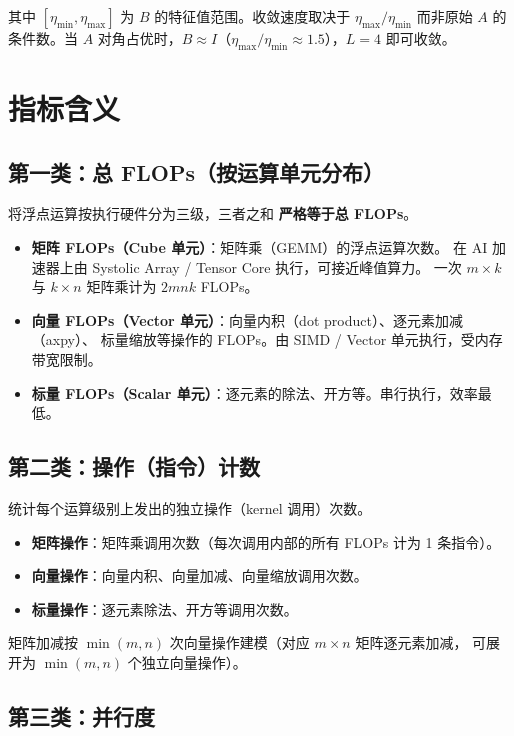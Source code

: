 \documentclass[11pt,a4paper]{ctexart}
\begin{document}
其中 $[\eta_{\min}, \eta_{\max}]$ 为 $B$ 的特征值范围。收敛速度取决于 $\eta_{\max}/\eta_{\min}$ 而非原始 $A$ 的条件数。当 $A$ 对角占优时，$B \approx I$（$\eta_{\max}/\eta_{\min} \approx 1.5$），$L=4$ 即可收敛。

\section{指标含义}

\subsection{第一类：总 FLOPs（按运算单元分布）}

将浮点运算按执行硬件分为三级，三者之和 \textbf{严格等于总 FLOPs}。

\begin{itemize}[leftmargin=*]
    \item \textbf{矩阵 FLOPs（Cube 单元）}：矩阵乘（GEMM）的浮点运算次数。
          在 AI 加速器上由 Systolic Array / Tensor Core 执行，可接近峰值算力。
          一次 $m\times k$ 与 $k\times n$ 矩阵乘计为 $2mnk$ FLOPs。
    \item \textbf{向量 FLOPs（Vector 单元）}：向量内积（dot product）、逐元素加减（axpy）、
          标量缩放等操作的 FLOPs。由 SIMD / Vector 单元执行，受内存带宽限制。
    \item \textbf{标量 FLOPs（Scalar 单元）}：逐元素的除法、开方等。串行执行，效率最低。
\end{itemize}

\subsection{第二类：操作（指令）计数}

统计每个运算级别上发出的独立操作（kernel 调用）次数。

\begin{itemize}[leftmargin=*]
    \item \textbf{矩阵操作}：矩阵乘调用次数（每次调用内部的所有 FLOPs 计为 1 条指令）。
    \item \textbf{向量操作}：向量内积、向量加减、向量缩放调用次数。
    \item \textbf{标量操作}：逐元素除法、开方等调用次数。
\end{itemize}

\noindent 矩阵加减按 $\min(m,n)$ 次向量操作建模（对应 $m\times n$ 矩阵逐元素加减，
可展开为 $\min(m,n)$ 个独立向量操作）。

\subsection{第三类：并行度}
\end{document}

